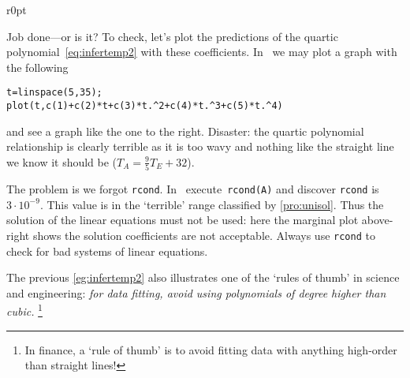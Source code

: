 \begin{example}
\begin{solution}
\begin{wrapfigure}[7]r{0pt}
\end{wrapfigure}
Job done---or is it?
To check, let's plot the predictions of the quartic polynomial~\eqref{eq:infertemp2} with these coefficients.
In \script\ we may plot a graph with the following
\setbox\ajrqrbox\hbox{}%
\marginajrbox%
\begin{verbatim}
t=linspace(5,35);
plot(t,c(1)+c(2)*t+c(3)*t.^2+c(4)*t.^3+c(5)*t.^4)
\end{verbatim}
and see a graph like the one to the right.
Disaster: the quartic polynomial relationship is clearly terrible as it is too wavy and nothing like the straight line we know it should be (\(T_A=\frac95T_E+32\)).

The problem is we forgot \verb|rcond|.
In \script\ execute~\verb|rcond(A)| and discover \verb|rcond| is \(3\cdot10^{-9}\).
This value is in the `terrible' range classified by \cref{pro:unisol}.
Thus the solution of the linear equations must not be used: here the marginal plot above-right shows the solution coefficients are not acceptable.
Always use \verb|rcond| to check for bad systems of linear equations.
\aqed\par
\end{solution}
\end{example}

The previous \cref{eg:infertemp2} also illustrates one of the `rules of thumb' in science and engineering: \emph{for data fitting, avoid using polynomials of degree higher than cubic.}
\footnote{In finance, a `rule of thumb' is to avoid fitting data with anything high-order than straight lines!}


